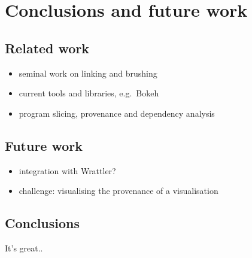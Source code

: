 \section{Conclusions and future work}
\label{sec:conclusion}

\subsection{Related work}
\label{sec:related-work}

\begin{itemize}
  \item seminal work on linking and brushing
  \item current tools and libraries, e.g.~Bokeh
  \item program slicing, provenance and dependency analysis
\end{itemize}

\subsection{Future work}

\begin{itemize}
  \item integration with Wrattler?
  \item challenge: visualising the provenance of a visualisation
\end{itemize}

\subsection{Conclusions}
It's great..

\begin{comment}
There are a number of challenges associated with making our approach practical
and appealing to actual data scientists. A central usability challenge is
visualising these complex relationships between the various parts of a
visualisation and the relevant data and/or visualisation code. This is
essentially a higher-order visualisation problem: visualising information about
the provenance of visualisations. Ideas from temporal data visualisation
\cite{bach16}, data-driven storytelling \cite{bach18}, and ``literate''
visualisation \cite{wood19} may inform our efforts here.
\end{comment}
